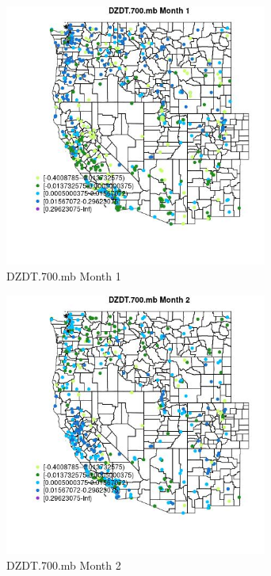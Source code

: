 \begin{figure} 
\centering  
\includegraphics[width=0.77\textwidth]{Code_Outputs/Report_ML_input_PM25_Step4_part_e_de_duplicated_aves_compiled_2019-05-18wNAs_MapObsMo1DZDT700mb.jpg} 
\caption{\label{fig:Report_ML_input_PM25_Step4_part_e_de_duplicated_aves_compiled_2019-05-18wNAsMapObsMo1DZDT700mb}DZDT.700.mb Month 1} 
\end{figure} 
 

\clearpage 

\begin{figure} 
\centering  
\includegraphics[width=0.77\textwidth]{Code_Outputs/Report_ML_input_PM25_Step4_part_e_de_duplicated_aves_compiled_2019-05-18wNAs_MapObsMo2DZDT700mb.jpg} 
\caption{\label{fig:Report_ML_input_PM25_Step4_part_e_de_duplicated_aves_compiled_2019-05-18wNAsMapObsMo2DZDT700mb}DZDT.700.mb Month 2} 
\end{figure} 
 

